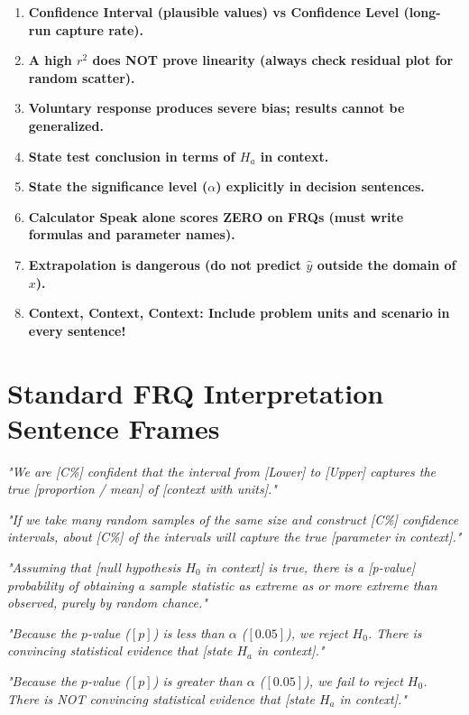 \documentclass[11pt,oneside,openany]{book}
\begin{document}
\begin{enumerate}[label=\textbf{\arabic*.}, leftmargin=*]
    \item \textbf{Confidence Interval (plausible values) vs Confidence Level (long-run capture rate).}
    \item \textbf{A high $r^2$ does NOT prove linearity (always check residual plot for random scatter).}
    \item \textbf{Voluntary response produces severe bias; results cannot be generalized.}
    \item \textbf{State test conclusion in terms of $H_a$ in context.}
    \item \textbf{State the significance level ($\alpha$) explicitly in decision sentences.}
    \item \textbf{Calculator Speak alone scores ZERO on FRQs (must write formulas and parameter names).}
    \item \textbf{Extrapolation is dangerous (do not predict $\hat{y}$ outside the domain of $x$).}
    \item \textbf{Context, Context, Context: Include problem units and scenario in every sentence!}
\end{enumerate}

\chapter{Standard FRQ Interpretation Sentence Frames}

\begin{templatebox}
\emph{"We are [C\%] confident that the interval from [Lower] to [Upper] captures the true [proportion / mean] of [context with units]."}
\end{templatebox}

\begin{templatebox}
\emph{"If we take many random samples of the same size and construct [C\%] confidence intervals, about [C\%] of the intervals will capture the true [parameter in context]."}
\end{templatebox}

\begin{templatebox}
\emph{"Assuming that [null hypothesis $H_0$ in context] is true, there is a [p-value] probability of obtaining a sample statistic as extreme as or more extreme than observed, purely by random chance."}
\end{templatebox}

\begin{templatebox}
\emph{"Because the $p$-value ($[p]$) is less than $\alpha$ ($[0.05]$), we reject $H_0$. There is convincing statistical evidence that [state $H_a$ in context]."}
\end{templatebox}

\begin{templatebox}
\emph{"Because the $p$-value ($[p]$) is greater than $\alpha$ ($[0.05]$), we fail to reject $H_0$. There is NOT convincing statistical evidence that [state $H_a$ in context]."}
\end{templatebox}
\end{document}
